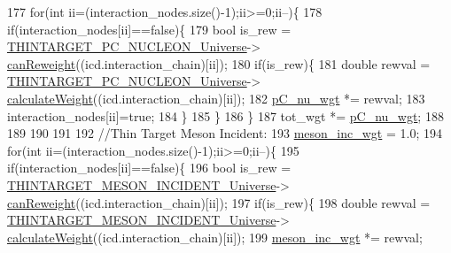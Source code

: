 \begin{DoxyCode}
177     \textcolor{keywordflow}{for}(\textcolor{keywordtype}{int} ii=(interaction\_nodes.size()-1);ii>=0;ii--)\{        
178       \textcolor{keywordflow}{if}(interaction\_nodes[ii]==\textcolor{keyword}{false})\{
179         \textcolor{keywordtype}{bool} is\_rew = \hyperlink{class_neutrino_flux_reweight_1_1_reweight_driver_a86849016485121f8bb72d32e0f851379}{THINTARGET\_PC\_NUCLEON\_Universe}->
      \hyperlink{class_neutrino_flux_reweight_1_1_thin_targetp_c_nucleon_reweighter_a974bafd329ce322beef237061f446694}{canReweight}((icd.interaction\_chain)[ii]);
180         \textcolor{keywordflow}{if}(is\_rew)\{
181           \textcolor{keywordtype}{double} rewval = \hyperlink{class_neutrino_flux_reweight_1_1_reweight_driver_a86849016485121f8bb72d32e0f851379}{THINTARGET\_PC\_NUCLEON\_Universe}->
      \hyperlink{class_neutrino_flux_reweight_1_1_thin_targetp_c_nucleon_reweighter_a6bf9833d98dab84af820f05cf2ff851b}{calculateWeight}((icd.interaction\_chain)[ii]);
182           \hyperlink{class_neutrino_flux_reweight_1_1_reweight_driver_a96bc68526c4939c0018aa41d94c3a106}{pC\_nu\_wgt} *= rewval;
183           interaction\_nodes[ii]=\textcolor{keyword}{true};
184         \}
185       \}
186     \}
187     tot\_wgt *= \hyperlink{class_neutrino_flux_reweight_1_1_reweight_driver_a96bc68526c4939c0018aa41d94c3a106}{pC\_nu\_wgt};
188 
189   
190 
191     
192     \textcolor{comment}{//Thin Target Meson Incident:}
193     \hyperlink{class_neutrino_flux_reweight_1_1_reweight_driver_a3b30ffd833e048ca64026eac4e26e054}{meson\_inc\_wgt} = 1.0; 
194     \textcolor{keywordflow}{for}(\textcolor{keywordtype}{int} ii=(interaction\_nodes.size()-1);ii>=0;ii--)\{        
195       \textcolor{keywordflow}{if}(interaction\_nodes[ii]==\textcolor{keyword}{false})\{
196         \textcolor{keywordtype}{bool} is\_rew = \hyperlink{class_neutrino_flux_reweight_1_1_reweight_driver_abc7d7800e76704e573cc04c4d73a5363}{THINTARGET\_MESON\_INCIDENT\_Universe}->
      \hyperlink{class_neutrino_flux_reweight_1_1_thin_target_meson_incident_reweighter_ad6974a8bf1b26e86252ee2bc1e112c5a}{canReweight}((icd.interaction\_chain)[ii]);
197         \textcolor{keywordflow}{if}(is\_rew)\{
198           \textcolor{keywordtype}{double} rewval = \hyperlink{class_neutrino_flux_reweight_1_1_reweight_driver_abc7d7800e76704e573cc04c4d73a5363}{THINTARGET\_MESON\_INCIDENT\_Universe}->
      \hyperlink{class_neutrino_flux_reweight_1_1_thin_target_meson_incident_reweighter_adfb3f3e69286e74c6a9c681a0593b4d5}{calculateWeight}((icd.interaction\_chain)[ii]);
199           \hyperlink{class_neutrino_flux_reweight_1_1_reweight_driver_a3b30ffd833e048ca64026eac4e26e054}{meson\_inc\_wgt} *= rewval;

\end{DoxyCode}
